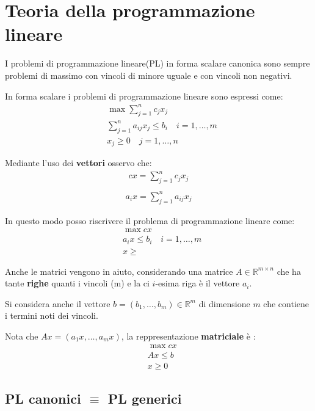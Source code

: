 %
\chapter{Teoria della programmazione lineare}

I problemi di programmazione lineare(PL) in forma scalare canonica sono sempre problemi di massimo con vincoli di minore uguale e con vincoli non negativi.

In forma scalare i problemi di programmazione lineare sono espressi come:
\begin{align}
	 & \max \sum_{j=1}^n c_j x_j                              \\
	 & \sum_{j=1}^n a_{ij} x_j \leq b_i \quad i = 1, \dots, m \\
	 & x_j \geq 0 \quad j =1, \dots, n
\end{align}

Mediante l'uso dei \textbf{vettori} osservo che:
\begin{align}
	cx = \sum_{j=1}^n c_j x_j \\
\end{align}
\begin{align}
	a_i x = \sum_{j=1}^n a_{ij} x_j
\end{align}

In questo modo posso riscrivere il problema di programmazione lineare come:
\begin{align}
	 & \max cx                              \\
	 & a_i x \leq b_i \quad i = 1, \dots, m \\
	 & x \geq
\end{align}

Anche le matrici vengono in aiuto, considerando una matrice $A \in \mathbb{R}^{m\times n}$ che ha tante \textbf{righe} quanti i vincoli (m) e la ci $i$-esima riga è il vettore $a_i$.

Si considera anche il vettore $b=(b_1, \dots, b_m) \in \mathbb{R}^{m}$ di dimensione $m$ che contiene i termini noti dei vincoli.

Nota che $Ax = (a_1 x, \dots, a_m x)$, la reppresentazione \textbf{matriciale} è :
\begin{align}
	 & \max cx   \\
	 & Ax \leq b \\
	 & x \geq 0
\end{align}


\section{PL canonici $\equiv$ PL generici}

